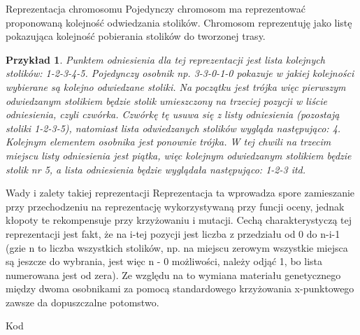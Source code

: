 \documentclass[a4paper,10pt]{beamer}
\newtheorem{przyk}{Przykład}[subsection]
\begin{document}
		\begin{frame}{Reprezentacja chromosomu}
			Pojedynczy chromosom ma reprezentować proponowaną kolejność odwiedzania stolików. Chromosom reprezentuję jako listę pokazująca kolejność pobierania stolików do tworzonej trasy.
			
			\begin{przyk}
					Punktem odniesienia dla tej reprezentacji jest lista kolejnych stolików: 1-2-3-4-5. Pojedynczy osobnik np. 3-3-0-1-0 pokazuje w jakiej kolejności wybierane są kolejno odwiedzane stoliki. Na początku jest trójka więc pierwszym odwiedzanym stolikiem będzie stolik umieszczony na trzeciej pozycji w liście odniesienia, czyli czwórka. Czwórkę tę usuwa się z listy odniesienia (pozostają stoliki 1-2-3-5), natomiast lista odwiedzanych stolików wygląda następująco: 4.
					Kolejnym elementem osobnika jest ponownie trójka. W tej chwili na trzecim miejscu listy odniesienia jest piątka, więc kolejnym odwiedzanym stolikiem będzie stolik nr 5, a lista odniesienia będzie wyglądała następująco: 1-2-3 itd.
			\end{przyk}
		\end{frame}
		\begin{frame}{Wady i zalety takiej reprezentacji}
			Reprezentacja ta wprowadza spore zamieszanie przy przechodzeniu na reprezentację wykorzystywaną przy funcji oceny, jednak kłopoty te rekompensuje przy krzyżowaniu i mutacji. Cechą charakterystyczą tej reprezentacji jest fakt, że na i-tej pozycji jest liczba z przedziału od 0 do n-i-1 (gzie n to liczba wszystkich stolików, np. na miejscu zerowym wszystkie miejsca są jeszcze do wybrania, jest więc n - 0 możliwości, należy odjąć 1, bo lista numerowana jest od zera). Ze względu na to wymiana materiału genetycznego między dwoma osobnikami za pomocą standardowego krzyżowania x-punktowego zawsze da dopuszczalne potomstwo.
		\end{frame}
		\begin{frame}{Kod}
		\end{frame}
\end{document}
